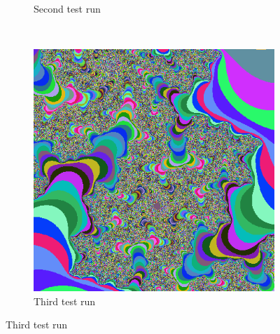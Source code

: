 \begin{figure}
\begin{subfigure}[b]{0.3\textwidth}
                \caption*{Second test run}
        \end{subfigure}
         ~
        \begin{subfigure}[b]{0.3\textwidth}
                \includegraphics[width=\textwidth]{randomcolor}
                \caption*{Third test run}
        \end{subfigure}
\end{figure}
